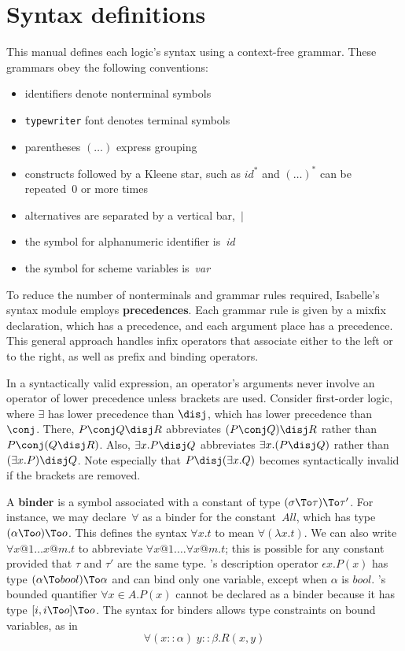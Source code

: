 \section{Syntax definitions}
This manual defines each logic's syntax using a context-free grammar.
These grammars obey the following conventions:
\begin{itemize}
\item identifiers denote nonterminal symbols
\item {\tt typewriter} font denotes terminal symbols
\item parentheses $(\ldots)$ express grouping
\item constructs followed by a Kleene star, such as $id^*$ and $(\ldots)^*$
can be repeated~0 or more times 
\item alternatives are separated by a vertical bar,~$|$
\item the symbol for alphanumeric identifier is~{\it id\/} 
\item the symbol for scheme variables is~{\it var}
\end{itemize}
To reduce the number of nonterminals and grammar rules required, Isabelle's
syntax module employs {\bf precedences}.  Each grammar rule is given by a
mixfix declaration, which has a precedence, and each argument place has a
precedence.  This general approach handles infix operators that associate
either to the left or to the right, as well as prefix and binding
operators.

In a syntactically valid expression, an operator's arguments never involve
an operator of lower precedence unless brackets are used.  Consider
first-order logic, where $\exists$ has lower precedence than $\disj$,
which has lower precedence than $\conj$.  There, $P\conj Q \disj R$
abbreviates $(P\conj Q) \disj R$ rather than $P\conj (Q\disj R)$.  Also,
$\exists x.P\disj Q$ abbreviates $\exists x.(P\disj Q)$ rather than
$(\exists x.P)\disj Q$.  Note especially that $P\disj(\exists x.Q)$
becomes syntactically invalid if the brackets are removed.

A {\bf binder} is a symbol associated with a constant of type
$(\sigma\To\tau)\To\tau'$.  For instance, we may declare~$\forall$ as a
binder for the constant~$All$, which has type $(\alpha\To o)\To o$.  This
defines the syntax $\forall x.t$ to mean $\forall(\lambda x.t)$.  We can
also write $\forall x@1\ldots x@m.t$ to abbreviate $\forall x@1.  \ldots
\forall x@m.t$; this is possible for any constant provided that $\tau$ and
$\tau'$ are the same type.  \HOL's description operator $\epsilon x.P(x)$
has type $(\alpha\To bool)\To\alpha$ and can bind only one variable, except
when $\alpha$ is $bool$.  \ZF's bounded quantifier $\forall x\in A.P(x)$
cannot be declared as a binder because it has type $[i, i\To o]\To o$.  The
syntax for binders allows type constraints on bound variables, as in
\[ \forall (x{::}\alpha) \; y{::}\beta. R(x,y) \]

